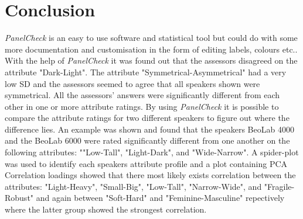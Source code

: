 \section*{Conclusion}
\textit{PanelCheck} is an easy to use software and statistical tool but could do with some more documentation and customisation in the form of editing labels, colours etc.. With the help of \textit{PanelCheck} it was found out that the assessors disagreed on the attribute "Dark-Light". The attribute "Symmetrical-Asymmetrical" had a very low SD and the assessors seemed to agree that all speakers shown were symmetrical. All the assessors' answers were significantly different from each other in one or more attribute ratings. By using \textit{PanelCheck} it is possible to compare the attribute ratings for two different speakers to figure out where the difference lies. An example was shown and found that the speakers BeoLab 4000 and the BeoLab 6000 were rated significantly different from one another on the following attributes: ""Low-Tall", "Light-Dark", and "Wide-Narrow". A spider-plot was used to identify each speakers attribute profile and a plot containing PCA Correlation loadings showed that there most likely exists correlation between the attributes: "Light-Heavy", "Small-Big",  "Low-Tall", "Narrow-Wide", and "Fragile-Robust" and again between "Soft-Hard" and "Feminine-Masculine" repectively where the latter group showed the strongest correlation.